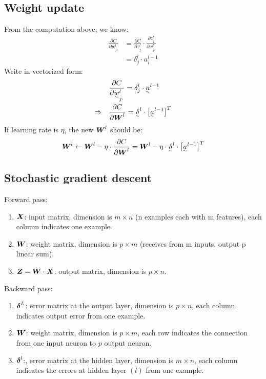 \documentclass{extarticle}
\theoremstyle{definition}
\theoremstyle{definition}
\newcommand{\mdvec}[1]{\underset{^\sim}#1} %
\newcommand{\mdmat}[1]{\boldsymbol{\MakeUppercase{#1}}} %
\begin{document}
\subsection{Weight update}
From the computation above, we know:
\begin{align*}
	\frac{\partial C}{\partial w_{ji}^l} &= \frac{\partial C}{\partial z_j^l} \cdot \frac{\partial z_j^l}{\partial w_{ji}^l}\\
		&= \delta_j^l \cdot a_i^{l-1}
\end{align*}
Write in vectorized form:
\begin{align*}
	\quad & \quad \frac{\partial C}{\partial \mdvec{w_{j\cdot}}^l} = \delta_j^l \cdot \mdvec{a^{l-1}}\\
	\Rightarrow & \quad \frac{\partial C}{\partial \mdmat{w}^l} = \mdvec{\delta^l} \cdot \big[\mdvec{a^{l-1}}\big]^T
\end{align*}
If learning rate is $\eta$, the new $\mdmat{w}^l$ should be:
\begin{align*}
	\mdmat{w}^l \leftarrow \mdmat{w}^l - \eta \cdot \frac{\partial C}{\partial \mdmat{w}^l} = \mdmat{w}^l - \eta \cdot \mdvec{\delta^l} \cdot \big[\mdvec{a^{l-1}}\big]^T
\end{align*}

\subsection{Stochastic gradient descent}
Forward pass:
\begin{enumerate}
	\item $\mdmat{x}$: input matrix, dimension is $m \times n$ (n examples each with m features), each column indicates one example.
	\item $\mdmat{w}$: weight matrix, dimension is $p \times m$ (receives from m inputs, output p linear sum).
	\item $\mdmat{z} = \mdmat{w} \cdot \mdmat{x}$: output matrix, dimension is $p \times n$.
\end{enumerate}
Backward pass:
\begin{enumerate}
	\item $\mdmat{\delta}^L$: error matrix at the output layer, dimension is $p \times n$, each column indicates output error from one example.
	\item $\mdmat{w}$: weight matrix, dimension is $p \times m$, each row indicates the connection from one input neuron to $p$ output neuron.
	\item $\mdmat{\delta}^l$:, error matrix at the hidden layer, dimension is $m \times n$, each column indicates the errors at hidden layer $(l)$ from one example.
\end{enumerate}
\end{document}
